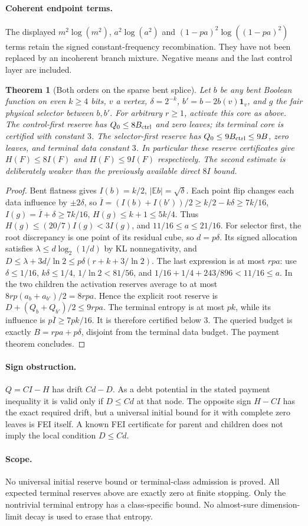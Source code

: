 \documentclass{article}
\newtheorem{theorem}{Theorem}
\begin{document}
\paragraph{Coherent endpoint terms.}
The displayed $m^2\log(m^2)$, $a^2\log(a^2)$ and
$(1-pa)^2\log((1-pa)^2)$ terms retain the signed constant-frequency
recombination. They have not been replaced by an incoherent branch mixture.
Negative means and the last control layer are included.

\begin{theorem}[Both orders on the sparse bent splice]
Let $b$ be any bent Boolean function on even $k\ge4$ bits, $v$ a vertex,
$\delta=2^{-k}$, $b'=b-2b(v)\mathbf1_v$, and $g$ the fair physical
selector between $b,b'$. For arbitrary $r\ge1$, activate this core as above.
The control-first reserve has $Q_0\le8B_{\rm ctrl}$ and zero leaves;
its terminal core is certified with constant $3$. The selector-first
reserve has $Q_0\le9B_{\rm ctrl}\le9B$, zero leaves, and terminal
data constant $3$. In particular these reserve certificates give
$H(F)\le8I(F)$ and $H(F)\le9I(F)$ respectively. The second estimate
is deliberately weaker than the previously available direct $8I$ bound.
\end{theorem}
\begin{proof}
Bent flatness gives $I(b)=k/2$, $|\mathbb Eb|=\sqrt\delta$.
Each point flip changes each data influence by $\pm2\delta$, so
$\overline I=(I(b)+I(b'))/2\ge k/2-k\delta\ge7k/16$,
$I(g)=\overline I+\delta\ge7k/16$, $H(g)\le k+1\le5k/4$.
Thus $H(g)\le(20/7)I(g)<3I(g)$, and
$11/16\le a\le21/16$.
For selector first, the root discrepancy is one point of its residual
cube, so $d=p\delta$. Its signed allocation satisfies
$\lambda\le d\log_2(1/d)$ by KL nonnegativity, and
$D\le\lambda+3d/\ln2\le p\delta(r+k+3/\ln2)$.
The last expression is at most $rpa$: use
$\delta\le1/16$, $k\delta\le1/4$, $1/\ln2<81/56$,
and $1/16+1/4+243/896<11/16\le a$.
In the two children the activation reserves average to at most
$8rp(a_b+a_{b'})/2=8rpa$. Hence the explicit root reserve
is $D+(Q_b+Q_{b'})/2\le9rpa$.
The terminal entropy is at most $pk$, while its influence is
$p\overline I\ge7pk/16$. It is therefore certified below $3$.
The queried budget is exactly $B=rpa+p\delta$, disjoint from the
terminal data budget. The payment theorem concludes.
\end{proof}

\paragraph{Sign obstruction.}
$Q=CI-H$ has drift $Cd-D$. As a debt potential in the stated payment
inequality it is valid only if $D\le Cd$ at that node. The opposite
sign $H-CI$ has the exact required drift, but a universal initial bound
for it with complete zero leaves is FEI itself. A known FEI certificate
for parent and children does not imply the local condition $D\le Cd$.

\paragraph{Scope.}
No universal initial reserve bound or terminal-class admission is proved.
All expected terminal reserves above are exactly zero at finite stopping.
Only the nontrivial terminal entropy has a class-specific bound. No
almost-sure dimension-limit decay is used to erase that entropy.
\end{document}

